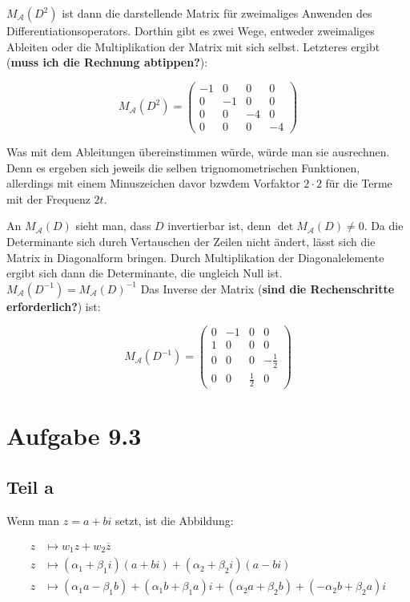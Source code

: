 \documentclass[a4paper,german,12pt,smallheadings]{scrartcl}
\begin{document}
$M_{\mathcal{A}}(D^2)$ ist dann die darstellende Matrix für zweimaliges
Anwenden des Differentiationsoperators. Dorthin gibt es zwei Wege, entweder
zweimaliges Ableiten oder die Multiplikation der Matrix mit sich selbst.
Letzteres ergibt (\textbf{muss ich die Rechnung abtippen?}):

\begin{equation}
  M_{\mathcal{A}}(D^2) = \begin{pmatrix}-1 & 0 & 0 & 0 \\ 0 & -1 & 0 & 0 \\ 0 & 0 & -4 & 0 \\ 0 & 0 & 0 & -4\end{pmatrix}
\end{equation}

Was mit dem Ableitungen übereinstimmen würde, würde man sie ausrechnen. Denn es
ergeben sich jeweils die selben trignomometrischen Funktionen, allerdings mit
einem Minuszeichen davor bzw\. dem Vorfaktor $2 \cdot 2$ für die Terme mit der
Frequenz $2t$.

An $M_{\mathcal{A}}(D)$ sieht man, dass $D$ invertierbar ist, denn $\det
M_{\mathcal{A}}(D) \neq 0$. Da die Determinante sich durch Vertauschen der
Zeilen nicht ändert, lässt sich die Matrix in Diagonalform bringen. Durch
Multiplikation der Diagonalelemente ergibt sich dann die Determinante, die
ungleich Null ist. $M_{\mathcal{A}}(D^{-1}) = M_{\mathcal{A}}(D)^{-1}$  Das
Inverse der Matrix (\textbf{sind die Rechenschritte erforderlich?}) ist:

\begin{equation}
  M_{\mathcal{A}}(D^{-1}) = \begin{pmatrix}0 & -1 & 0 & 0 \\ 1 & 0 & 0 & 0 \\ 0 & 0 & 0 & -\frac{1}{2} \\ 0 & 0 & \frac{1}{2} & 0\end{pmatrix}
\end{equation}

\section*{Aufgabe 9.3}
\subsection*{Teil a}
Wenn man $z = a+bi$ setzt, ist die Abbildung:

\begin{align*}
  z &\mapsto w_1z + w_2\overline{z} \\
  z &\mapsto (\alpha_1 + \beta_1i)(a+bi) + (\alpha_2+\beta_2i)(a-bi) \\
  z &\mapsto (\alpha_1a-\beta_1b) + (\alpha_1b + \beta_1a)i + (\alpha_2a+\beta_2b)+(-\alpha_2b+\beta_2a)i
\end{align*}
\end{document}
